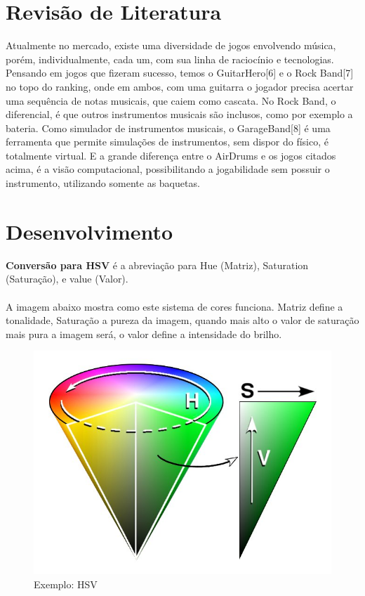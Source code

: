 \documentclass{sciposter}
\begin{document}
\begin{multicols}{3}
\section{Revisão de Literatura}
Atualmente no mercado, existe uma diversidade de jogos envolvendo música, porém, individualmente, cada um, com sua linha de raciocínio e tecnologias.
Pensando em jogos que fizeram sucesso, temos o GuitarHero[6] e o Rock Band[7] no topo do ranking, onde em ambos, com uma guitarra o jogador precisa acertar uma sequência de notas musicais, que caiem como cascata. No Rock Band, o diferencial, é que outros instrumentos musicais são inclusos, como por exemplo a bateria.
Como simulador de instrumentos musicais, o GarageBand[8] é uma ferramenta que permite simulações de instrumentos, sem dispor do físico, é totalmente virtual. 
E a grande diferença entre o AirDrums e os jogos citados acima, é a visão computacional, possibilitando a jogabilidade sem possuir o instrumento, utilizando somente as baquetas.

\section{Desenvolvimento}

\textbf{Conversão para HSV} é a abreviação para Hue (Matriz), Saturation (Saturação), e value (Valor). \\ \\
A imagem abaixo mostra como este sistema de cores funciona. Matriz define a tonalidade, Saturação a pureza da imagem, quando mais alto o valor de saturação mais pura a imagem será, o valor define a intensidade do brilho.

\begin{figure}[!htb]
\centering
\includegraphics[scale=0.6]{HSV_cone.jpg}
\caption{Exemplo: HSV}
\end{figure}


\end{multicols}
\end{document}
